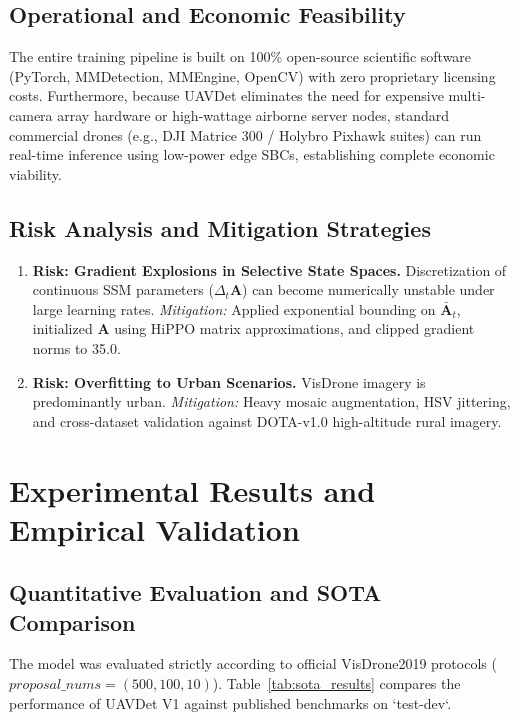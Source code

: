 \documentclass[12pt,a4paper]{report}
\begin{document}
\section{Operational and Economic Feasibility}
The entire training pipeline is built on 100\% open-source scientific software (PyTorch, MMDetection, MMEngine, OpenCV) with zero proprietary licensing costs. Furthermore, because UAVDet eliminates the need for expensive multi-camera array hardware or high-wattage airborne server nodes, standard commercial drones (e.g., DJI Matrice 300 / Holybro Pixhawk suites) can run real-time inference using low-power edge SBCs, establishing complete economic viability.

\section{Risk Analysis and Mitigation Strategies}
\begin{enumerate}[leftmargin=2em]
    \item \textbf{Risk: Gradient Explosions in Selective State Spaces.} Discretization of continuous SSM parameters ($\Delta_t \mathbf{A}$) can become numerically unstable under large learning rates.
    \textit{Mitigation:} Applied exponential bounding on $\mathbf{\bar{A}}_t$, initialized $\mathbf{A}$ using HiPPO matrix approximations, and clipped gradient norms to 35.0.
    \item \textbf{Risk: Overfitting to Urban Scenarios.} VisDrone imagery is predominantly urban.
    \textit{Mitigation:} Heavy mosaic augmentation, HSV jittering, and cross-dataset validation against DOTA-v1.0 high-altitude rural imagery.
\end{enumerate}

\chapter{Experimental Results and Empirical Validation}

\section{Quantitative Evaluation and SOTA Comparison}
The model was evaluated strictly according to official VisDrone2019 protocols ($ proposal\_nums=(500, 100, 10)$). Table~\ref{tab:sota_results} compares the performance of UAVDet V1 against published benchmarks on `test-dev`.
\end{document}
